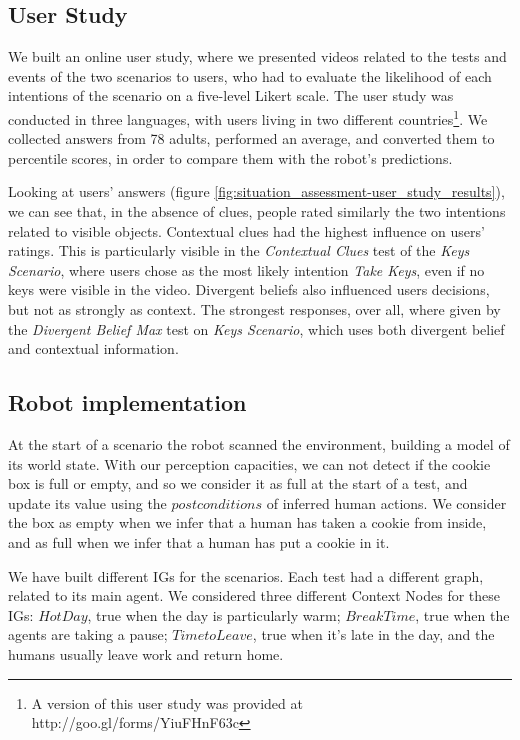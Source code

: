 \subsection{User Study}
We built an online user study, where we presented videos related to the tests and events of the two scenarios to users, who had to evaluate the likelihood of each intentions of the scenario
on a five-level Likert scale. The user study was conducted in three languages, with users living in two different countries\footnote{A version of this user study was provided at http://goo.gl/forms/YiuFHnF63c}. We collected answers from 78 adults, performed an average, and converted them to percentile scores, in order to compare them with the robot's predictions.

Looking at users' answers (figure \ref{fig:situation_assessment-user_study_results}), we can see that, in the absence of clues, people rated similarly the two intentions related to visible objects. Contextual clues had the highest influence on users' ratings. This is particularly visible in the \textit{Contextual Clues} test of the \textit{Keys Scenario}, where users chose as the most likely intention \textit{Take Keys}, even if no keys were visible in the video. Divergent beliefs also influenced users decisions, but not as strongly as context. The strongest responses, over all, where given by the \textit{Divergent Belief Max} test on \textit{Keys Scenario}, which uses both divergent belief and contextual information.

\subsection{Robot implementation}
At the start of a scenario the robot scanned the environment, building a model of its world state. With our perception capacities, we can not detect if the cookie box is full or empty, and so we consider it as full at the start of a test, and update its value using the $postconditions$ of inferred human actions. We consider the box as empty when we infer that a human has taken a cookie from inside, and as full when we infer that a human has put a cookie in it.

We have built different IGs for the scenarios. Each test had a different graph, related to its main agent. We considered three different Context Nodes for these IGs: $Hot Day$, true when the day is particularly warm; $Break Time$, true when the agents are taking a pause; $Time to Leave$, true when it's late in the day, and the humans usually leave work and return home.

